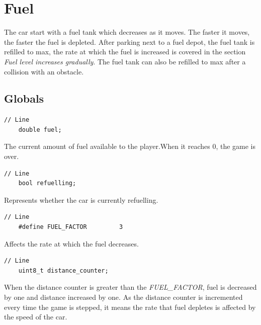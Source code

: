 \documentclass{article}
\begin{document}
\section{Fuel}
The car start with a fuel tank which decreases as it moves. The faster it moves, the faster the fuel is depleted. After parking next to a fuel depot, the fuel tank is refilled to max, the rate at which the fuel is increased is covered in the section \emph{Fuel level increases gradually}. The fuel tank can also be refilled to max after a collision with an obstacle. 

\subsection*{Globals}
\begin{lstlisting}[style=CStyle]
	// Line 
	double fuel;
\end{lstlisting}
The current amount of fuel available to the player.When it reaches 0, the game is over.
\begin{lstlisting}[style=CStyle]
	// Line 
	bool refuelling;
\end{lstlisting}
Represents whether the car is currently refuelling.
\begin{lstlisting}[style=CStyle]
	// Line 
	#define FUEL_FACTOR         3
\end{lstlisting}
Affects the rate at which the fuel decreases.
\begin{lstlisting}[style=CStyle]
	// Line 
	uint8_t distance_counter;
\end{lstlisting}
When the distance counter is greater than the \emph{FUEL\_FACTOR}, fuel is decreased by one and distance increased by one. As the distance counter is incremented every time the game is stepped, it means  the rate that fuel depletes is affected by the speed of the car.
\newline
\end{document}
